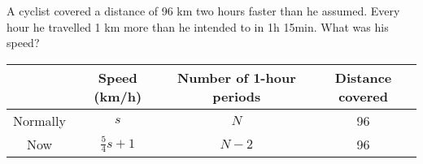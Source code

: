 
%
%
%
%
% 
% 

\question[5] A cyclist covered a distance of 96 km two hours faster than he assumed. Every hour
he travelled 1 km more than he intended to in 1h 15min. What was his speed?


\ifprintanswers
  \begin{table}
  	\begin{tabular}{cccc}
  	    \toprule
  		& Speed (km/h) & Number of 1-hour periods & Distance covered \\
  		\midrule
  		Normally & $s$ & $N$ & 96 \\
  		Now & $\frac{5}{4}s + 1$ & $N-2$ & 96 \\
  		\bottomrule
  	
  	\end{tabular}
  \end{table}
\fi 

